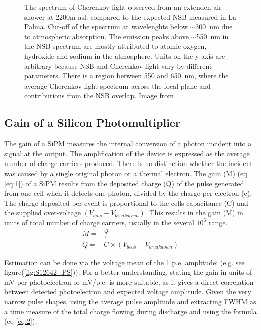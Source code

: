 \documentclass[12pt,article,type=msc,colorback,accentcolor=tud9c]{tudthesis}
\begin{document}
\begin{figure}[t!]
\begin{centering}
\caption[Cherenkov light spectrum]{The spectrum of Cherenkov light observed from an extenden air shower at 2200m asl. compared to the expected NSB measured in La Palma. Cut-off of the spectrum at wavelenghts below $\sim$300~nm due to atmospheric absorption. The emission peaks above $\sim$550~nm in the NSB spectrum are mostly attributed to atomic oxygen, hydroxide and sodium in the atmosphere. Units on the y-axis are arbitrary because NSB and Cherenkov light vary by different parameters. There is a region between 550 and 650~nm, where the average Cherenkov light spectrum across the focal plane and contributions from the NSB overlap. Image from \cite{SiPMvsMAPMT}}
\label{fig:Cherenkov_NSB}
\end{centering}
\end{figure}


\subsection{Gain of a Silicon Photomultiplier}
\label{subsec:SiPMGain}
The gain of a SiPM measures the internal conversion of a photon incident into a signal at the output. The amplification of the device is expressed as the average number of charge carriers produced. There is no distinction whether the incident was caused by a single original photon or a thermal electron. The gain (M) (eq \ref{eq:1}) of a SiPM results from the deposited charge (Q) of the pulse generated from one cell when it detects one photon, divided by the charge per electron (e). The charge deposited per event is proportional to the cells capacitance (C) and the supplied over-voltage $(V_{bias}-V_{breakdown})$.\cite{SiPMvsMAPMT} This results in the gain (M) in units of total number of charge carriers, usually in the several $10^6$ range.
\begin{equation}\label{eq:1}
\begin{split}
M = & \frac{Q}{e} \\
Q = &  C \times (V_{bias}-V_{breakdown})
\end{split}
\end{equation}

Estimation can be done via the voltage mean of the 1 p.e. amplitude: (e.g. see figure(\ref{fig:S12642_PS})). For a better understanding, stating the gain in units of mV per photoelectron or mV/p.e. is more suitable, as it gives a direct correlation between detected photoelectron and expected voltage amplitude. Given the very narrow pulse shapes, using the average pulse amplitude and extracting FWHM as a time measure of the total charge flowing during discharge and using the formula (eq \ref{eq:2}):
\end{document}
